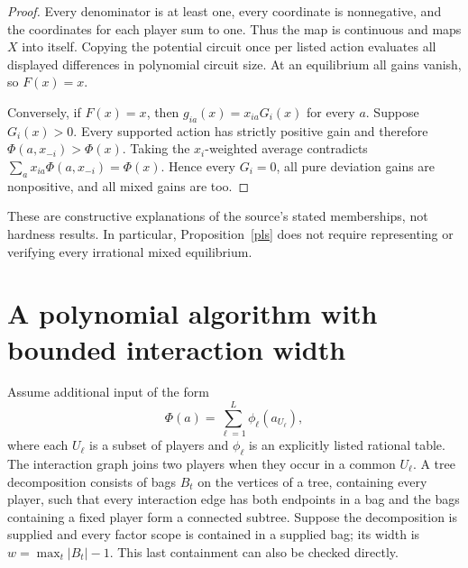 \documentclass[11pt]{article}
\theoremstyle{definition}
\begin{document}
\begin{proof}
Every denominator is at least one, every coordinate is nonnegative, and
the coordinates for each player sum to one. Thus the map is continuous
and maps $X$ into itself. Copying the potential circuit once per listed
action evaluates all displayed differences in polynomial circuit size.
At an equilibrium all gains vanish, so $F(x)=x$.

Conversely, if $F(x)=x$, then $g_{ia}(x)=x_{ia}G_i(x)$ for every $a$.
Suppose $G_i(x)>0$. Every supported action has strictly positive gain and
therefore $\Phi(a,x_{-i})>\Phi(x)$. Taking the $x_i$-weighted average
contradicts $\sum_a x_{ia}\Phi(a,x_{-i})=\Phi(x)$. Hence every $G_i=0$,
all pure deviation gains are nonpositive, and all mixed gains are too.
\end{proof}
These are constructive explanations of the source's stated memberships,
not hardness results. In particular, Proposition~\ref{pls} does not require
representing or verifying every irrational mixed equilibrium.

\section{A polynomial algorithm with bounded interaction width}
Assume additional input of the form
\[
 \Phi(a)=\sum_{\ell=1}^{L}\phi_\ell(a_{U_\ell}),
\]
where each $U_\ell$ is a subset of players and $\phi_\ell$ is an explicitly
listed rational table. The interaction graph joins two players when they
occur in a common $U_\ell$. A tree decomposition consists of bags $B_t$
on the vertices of a tree, containing every player, such that every
interaction edge has both endpoints in a bag and the bags containing a
fixed player form a connected subtree. Suppose the decomposition is
supplied and every factor scope is contained in a supplied bag; its width
is $w=\max_t|B_t|-1$. This last containment can also be checked directly.
\end{document}
